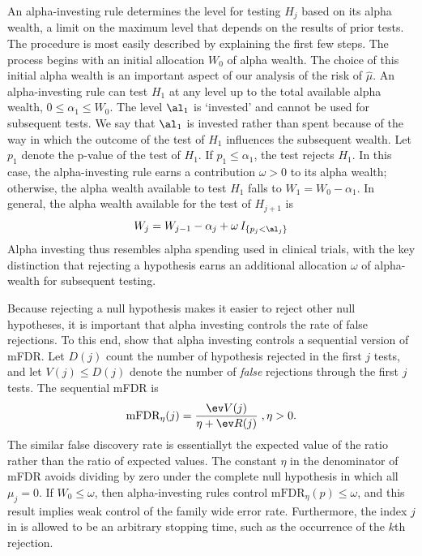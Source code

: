 \documentclass[12pt]{article}
\begin{document}
 An alpha-investing rule \citep{fosterstine08} determines the level for testing
 $H_j$ based on its alpha wealth, a limit on the maximum level that depends on
 the results of prior tests.  The procedure is most easily described by
 explaining the first few steps.  The process begins with an initial allocation
 $W_0$  of alpha wealth.  The choice of this initial alpha
 wealth is an important aspect of our analysis of the risk of $\hat\mu$.  An
 alpha-investing rule can test $H_1$ at any level up to the total available
 alpha wealth, $0 \le \alpha_1 \le W_0$.  The level $\al_1$ is `invested' and
 cannot be used for subsequent tests.  We say that $\al_1$ is invested rather
 than spent because of the way in which the outcome of the test of $H_1$
 influences the subsequent wealth.  Let $p_1$ denote the p-value of the test of
 $H_1$.  If $p_1 \le \alpha_1$, the test rejects $H_1$.  In this case, the
 alpha-investing rule earns a contribution $\omega > 0$ \marginpar{$\omega$} to
 its alpha wealth; otherwise, the alpha wealth available to test $H_1$ falls to
 $W_1 = W_0 - \alpha_1$.  In general, the alpha wealth available for the test of
 $H_{j+1}$ is 
 \begin{equation}
    W_{j} = W_{j-1} - \alpha_j + \omega \, I_{\{p_j < \al_j\}}
 \label{eq:Wj}
 \end{equation}
 Alpha investing thus resembles alpha spending used in clinical trials, with the
 key distinction that rejecting a hypothesis earns an additional allocation
 $\omega$ of alpha-wealth for subsequent testing.  


 Because rejecting a null hypothesis makes it easier to reject other null
 hypotheses, it is important that alpha investing controls the rate of false
 rejections.  To this end, \citet{fosterstine08} show that alpha investing
 controls a sequential version of mFDR.  Let $D(j)$ count the number of
 hypothesis rejected in the first $j$ tests, and let $V(j) \le D(j)$ denote the
 number of {\em false} rejections through the first $j$ tests.  The sequential mFDR is
 \begin{equation}
    \mbox{mFDR}_\eta(j) = \frac{\ev V(j)}{\eta + \ev R(j)} \;, \eta > 0.
 \label{eq:mFDR}
 \end{equation}
 The similar false discovery rate is essentiallyt the expected value of the
 ratio rather than the ratio of expected values.  The constant $\eta$ in the
 denominator of mFDR avoids dividing by zero under the complete null hypothesis
 in which all $\mu_j = 0$.  If $W_0 \le \omega$, then alpha-investing rules
 control $\mbox{mFDR}_\eta(p) \le \omega$, and this result implies weak control
 of the family wide error rate.  Furthermore, the index $j$ in  is
 allowed to be an arbitrary stopping time, such as the occurrence of the $k$th
 rejection.
\end{document}
